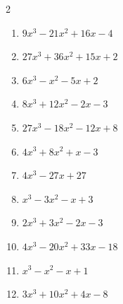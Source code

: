 \begin{multicols}{2}
\begin{enumerate}
        \phantom{$=(3x+1)(3x-2)(x+2)$}

\columnbreak %

\resetques

  \item $9x^{3}-21x^{2}+16x-4$


  \item $27x^{3}+36x^{2}+15x+2$


  \item $6x^{3}-x^{2}-5x+2$

        \phantom{$=(2x-1)(3x-2)(x+1)$}

  \item $8x^{3}+12x^{2}-2x-3$

        \phantom{$=(2x+1)(2x+3)(2x-1)$}

  \item $27x^{3}-18x^{2}-12x+8$


\columnbreak %

  \item $4x^{3}+8x^{2}+x-3$

        \phantom{$=(2x+3)(2x-1)(x+1)$}

  \item $4x^{3}-27x+27$


  \item $x^{3}-3x^{2}-x+3$

        \phantom{$=(x+1)(x-1)(x-3)$}

  \item $2x^{3}+3x^{2}-2x-3$

        \phantom{$=(2x+3)(x+1)(x-1)$}

  \item $4x^{3}-20x^{2}+33x-18$


\columnbreak %

\resetques

  \item $x^{3}-x^{2}-x+1$


  \item $3x^{3}+10x^{2}+4x-8$



\end{enumerate}
\end{multicols}
